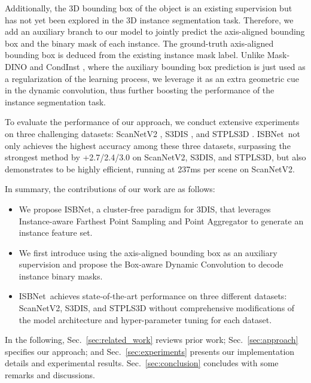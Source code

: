 \documentclass[10pt,twocolumn,letterpaper]{article}
\def\Approach{ISBNet}
\begin{document}
Additionally, the 3D bounding box of the object is an existing supervision but has not yet been explored in the 3D instance segmentation task. Therefore, we add an auxiliary branch to our model to jointly predict the axis-aligned bounding box and the binary mask of each instance. The ground-truth axis-aligned bounding box is deduced from the existing instance mask label. Unlike Mask-DINO \cite{li2022mask} and CondInst \cite{tian2020conditional}, where the auxiliary bounding box prediction is just used as a regularization of the learning process, we leverage it as an extra geometric cue in the dynamic convolution, thus further boosting the performance of the instance segmentation task.

To evaluate the performance of our approach, we conduct extensive experiments on three challenging datasets: ScanNetV2 \cite{dai2017scannet}, S3DIS \cite{armeni2017joint}, and STPLS3D \cite{chen2022stpls3d}. \Approach~not only achieves the highest accuracy among these three datasets, surpassing the strongest method by +2.7/2.4/3.0 on ScanNetV2, S3DIS, and STPLS3D, but also demonstrates to be highly efficient, running at 237ms per scene on ScanNetV2.

In summary, the contributions of our work are as follows:

\begin{itemize}[noitemsep,topsep=0pt,leftmargin=*]
    \item We propose \Approach, 
    a cluster-free paradigm for 3DIS, that leverages Instance-aware Farthest Point Sampling and Point Aggregator to generate an instance feature set.
    \item We first introduce using the axis-aligned bounding box as an auxiliary supervision and propose the Box-aware Dynamic Convolution to decode instance binary masks.
    \item \Approach~achieves state-of-the-art performance on three different datasets: ScanNetV2, S3DIS, and STPLS3D without comprehensive modifications of the model architecture and hyper-parameter tuning for each dataset.
\end{itemize}

In the following, Sec.~\ref{sec:related_work} reviews prior work; Sec.~\ref{sec:approach} specifies our approach; and Sec.~\ref{sec:experiments} presents our implementation details and experimental results. Sec.~\ref{sec:conclusion} concludes with some remarks and discussions.
\end{document}
